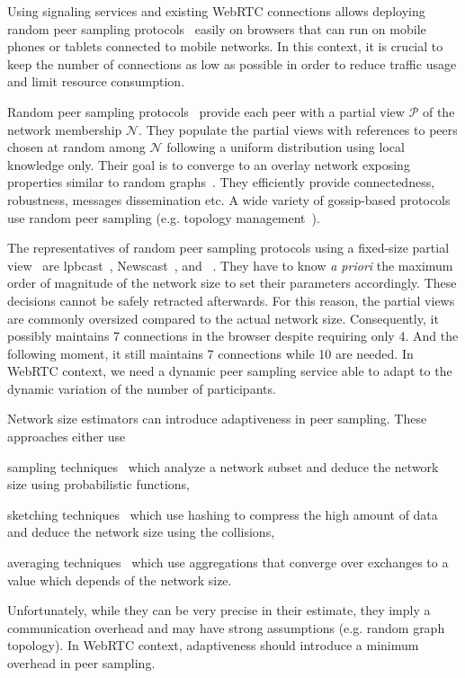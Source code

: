 Using signaling services and existing WebRTC connections allows deploying
random peer sampling protocols~\cite{jelasity2004peer} easily on browsers that
can run on mobile phones or tablets connected to mobile networks. In this
context, it is crucial to keep the number of connections as low as possible in
order to reduce traffic usage and limit resource consumption.

Random peer sampling protocols~\cite{jelasity2004peer} provide each
peer with a partial view $\mathcal{P}$ of the network membership
$\mathcal{N}$. They populate the partial views with references to
peers chosen at random among $\mathcal{N}$ following a uniform
distribution using local knowledge only. Their goal is to converge to
an overlay network exposing properties similar to random
graphs~\cite{erdos1959random}. They efficiently provide connectedness,
robustness, messages dissemination etc. A wide variety of gossip-based
protocols use random peer sampling (e.g. topology
management~\cite{voulgaris2005epidemic, jelasity2009tman,
  dabek2004vivaldi}).

The representatives of random peer sampling protocols using a fixed-size
partial view~\cite{jelasity2007gossip} are
lpbcast~\cite{eugster2003lightweight}, Newscast~\cite{tolgyeski2009adaptive},
and \CYCLON~\cite{voulgaris2005cyclon}. They have to know \emph{a priori} the
maximum order of magnitude of the network size to set their parameters
accordingly. These decisions cannot be safely retracted afterwards. For this
reason, the partial views are commonly oversized compared to the actual network
size. Consequently, it possibly maintains 7 connections in the browser despite
requiring only 4. And the following moment, it still maintains 7 connections
while 10 are needed. In WebRTC context, we need a dynamic peer sampling
service able to adapt to the dynamic variation of the number of participants.

Network size estimators can introduce adaptiveness in peer sampling. These
approaches either use
\begin{inparaenum}[(i)]
\item sampling techniques~\cite{mane05network, ganesh2007peer,
    kostoulas2007active} which analyze a network subset and deduce the network
  size using probabilistic functions,
\item sketching techniques~\cite{flajolet2008hyperloglog, baquero2012extrema}
  which use hashing to compress the high amount of data and deduce the network
  size using the collisions,
\item averaging techniques~\cite{jelasity2004epidemic, blasa2011symmetric}
  which use aggregations that converge over exchanges to a value which depends
  of the network size.
\end{inparaenum}
Unfortunately, while they can be very precise in their estimate, they imply a
communication overhead and may have strong assumptions (e.g. random graph
topology). In WebRTC context, adaptiveness should introduce a minimum overhead
in peer sampling.

